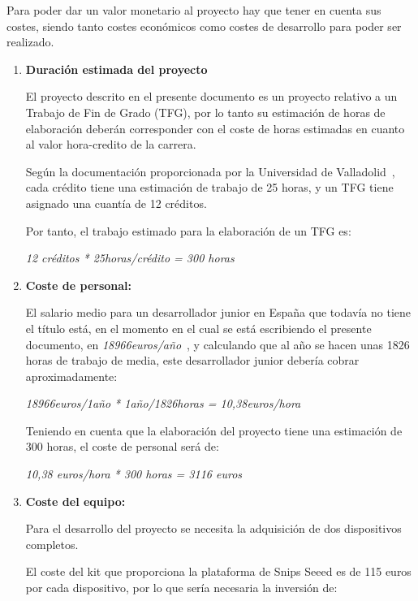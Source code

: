 Para poder dar un valor monetario al proyecto hay que tener en cuenta sus costes, siendo tanto costes económicos como costes de desarrollo para poder ser realizado.

\begin{enumerate}
    \item \textbf{Duración estimada del proyecto} \label{duracion_proyecto}
    
El proyecto descrito en el presente documento es un proyecto relativo a un Trabajo de Fin de Grado (TFG), por lo tanto su estimación de horas de elaboración deberán corresponder con el coste de horas estimadas en cuanto al valor hora-credito de la carrera.

Según la documentación proporcionada por la Universidad de Valladolid~\cite{hxc}, cada crédito tiene una estimación de trabajo de 25 horas, y un TFG tiene asignado una cuantía de 12 créditos.

Por tanto, el trabajo estimado para la elaboración de un TFG es:

\begin{center}
    \textit{12 créditos * 25horas/crédito = 300 horas}
\end{center}

    \item\textbf{ Coste de personal:}
    
El salario medio para un desarrollador junior en España que todavía no tiene el título está, en el momento en el cual se está escribiendo el presente documento, en \textit{18966euros/año}~\cite{salario-junior}, y calculando que al año se hacen unas 1826 horas de trabajo de media, este desarrollador junior debería cobrar aproximadamente:

\begin{center}
    \textit{18966euros/1año * 1año/1826horas = 10,38euros/hora}
\end{center}

Teniendo en cuenta que la elaboración del proyecto tiene una estimación de 300 horas, el coste de personal será de:

\begin{center}
    \textit{10,38 euros/hora * 300 horas = 3116 euros}
\end{center}

    \item \textbf{ Coste del equipo: }
    
Para el desarrollo del proyecto se necesita la adquisición de dos dispositivos completos.

El coste del kit que proporciona la plataforma de Snips Seeed es de 115 euros por cada dispositivo, por lo que sería necesaria la inversión de:


\end{enumerate}
